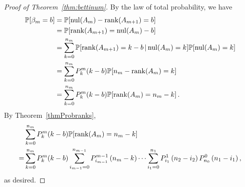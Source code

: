 
\begin{proof}[Proof of Theorem~\ref{thm:bettinum}]
  By the law of total probability, we have
  \begin{align*}
    \mathbb{P}[\beta_{m} = b] 
    &= \mathbb{P}[\mathrm{nul}(A_{m}) - \operatorname{\mathrm{rank}}(A_{m+1}) = b]\\
    &= \mathbb{P}[\operatorname{\mathrm{rank}}(A_{m+1}) = \mathrm{nul}(A_{m}) - b]\\
    &= \sum_{k=0}^{n_{m}}\mathbb{P}[\operatorname{\mathrm{rank}}(A_{m+1}) = k - b\,|\, \mathrm{nul}(A_{m})=k] \mathbb{P}[\mathrm{nul}(A_{m}) = k]\\
    &= \sum_{k=0}^{n_{m}} P_{k}^{m}(k-b)\mathbb{P}[n_{m} - \operatorname{\mathrm{rank}}(A_{m}) = k]\\
    &= \sum_{k=0}^{n_{m}} P_{k}^{m}(k-b)\mathbb{P}[\operatorname{\mathrm{rank}}(A_{m}) = n_{m} - k] \, .
  \end{align*}
  By Theorem~\ref{thmProbranks},
  \begin{align*}
    & \sum_{k=0}^{n_{m}} P_{k}^{m}(k-b)\mathbb{P}[\operatorname{\mathrm{rank}}(A_{m}) = n_{m} - k] \\
    =& \sum_{k=0}^{n_{m}} P_{k}^{m}(k-b)\sum_{i_{m-1}=0}^{n_{m-1}} P_{i_{m-1}}^{m-1}\left(n_{m} -k\right)
    \cdots
    \sum_{i_1 = 0}^{n_1} P_{i_1}^1\left(n_2 - i_2\right) P_{n_0}^0 \left(n_1 - i_1\right), 
  \end{align*}
  as desired.
\end{proof}




